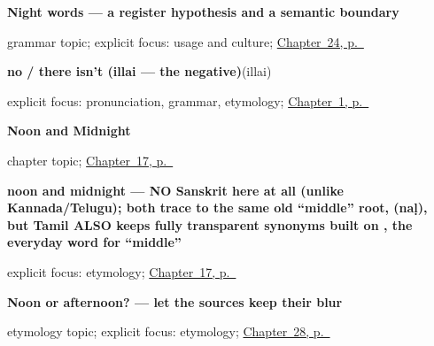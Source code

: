 \noindent\begin{minipage}[t]{\linewidth}
\raggedright
\textbf{Night words — a register hypothesis and a semantic boundary}\par
\footnotesize grammar topic; explicit focus: usage and culture; \hyperref[ch:ta-night]{Chapter~24, p.~\pageref*{ch:ta-night}}
\end{minipage}\par\smallskip

\noindent\begin{minipage}[t]{\linewidth}
\raggedright
\textbf{no / there isn't (illai — the negative)}\enspace\emph{}\enspace(illai)\par
\footnotesize explicit focus: pronunciation, grammar, etymology; \hyperref[ch:greetings]{Chapter~1, p.~\pageref*{ch:greetings}}
\end{minipage}\par\smallskip

\noindent\begin{minipage}[t]{\linewidth}
\raggedright
\textbf{Noon and Midnight}\par
\footnotesize chapter topic; \hyperref[ch:ta-noon-and-midnight]{Chapter~17, p.~\pageref*{ch:ta-noon-and-midnight}}
\end{minipage}\par\smallskip

\noindent\begin{minipage}[t]{\linewidth}
\raggedright
\textbf{noon and midnight — NO Sanskrit here at all (unlike Kannada/Telugu); both trace to the same old \textquotedblleft{}middle\textquotedblright{} root,  (naḷ), but Tamil ALSO keeps fully transparent synonyms built on , the everyday word for \textquotedblleft{}middle\textquotedblright{}}\enspace\emph{ }\par
\footnotesize explicit focus: etymology; \hyperref[ch:ta-noon-and-midnight]{Chapter~17, p.~\pageref*{ch:ta-noon-and-midnight}}
\end{minipage}\par\smallskip

\noindent\begin{minipage}[t]{\linewidth}
\raggedright
\textbf{Noon or afternoon? — let the sources keep their blur}\par
\footnotesize etymology topic; explicit focus: etymology; \hyperref[ch:ta-afternoon]{Chapter~28, p.~\pageref*{ch:ta-afternoon}}
\end{minipage}\par\smallskip

